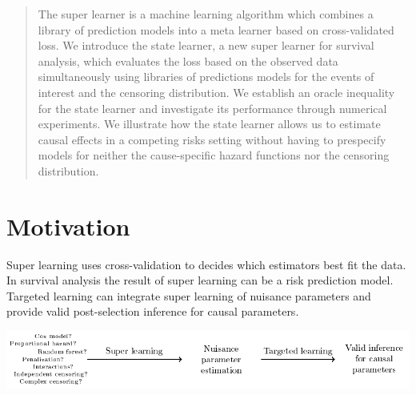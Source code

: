 \documentclass[a0,portrait]{a0poster}
\newcommand{\1}{\mathds{1}}
\begin{document}
\begin{minipage}{\textwidth}
\begin{minipage}[t]{1\linewidth}
\begin{multicols}{2}
    \color{black}    

\begin{abstract}

  The super learner is a machine learning algorithm which combines a
  library of prediction models into a meta learner based on
  cross-validated loss.  We introduce the state learner, a new super
  learner for survival analysis, which evaluates the loss based on the
  observed data simultaneously using libraries of predictions models
  for the events of interest and the censoring distribution. We
  establish an oracle inequality for the state learner and investigate
  its performance through numerical experiments. We illustrate how the
  state learner allows us to estimate causal effects in a competing
  risks setting without having to prespecify models for neither the
  cause-specific hazard functions nor the censoring distribution.
\end{abstract}




\section*{Motivation}

Super learning uses cross-validation to decides which estimators best
fit the data. In survival analysis the result of super learning can be
a risk prediction model. Targeted learning can integrate super
learning of nuisance parameters and provide valid post-selection
inference for causal parameters.

\begin{center}
  \includegraphics[width=1\linewidth]{motivation.pdf}
\end{center}


\end{multicols}
\end{minipage}
\end{minipage}
\end{document}
